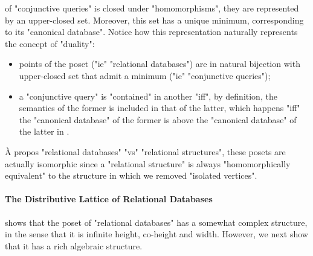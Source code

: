 of "conjunctive queries" is closed under "homomorphisms", they are represented by an upper-closed set. Moreover, this set has a unique minimum, corresponding to its "canonical database".
Notice how this representation naturally represents the concept of "duality":
\begin{itemize}
	\item points of the poset ("ie" "relational databases") are in natural
		bijection with upper-closed set that admit a minimum ("ie" "conjunctive queries");
	\item a "conjunctive query" is "contained" in another "iff", by definition,
		the semantics of the former is included in that of the latter, which happens
		"iff" the "canonical database" of the former is above the "canonical database" of the latter
		in .
\end{itemize}

\begin{remark}
	\label{rk:database-vs-structures}
	À propos "relational databases" "vs" "relational structures",
	these posets are actually isomorphic 
	since a "relational structure" is always "homomorphically equivalent"
	to the structure in which we removed "isolated vertices".
\end{remark}

\paragraph*{The Distributive Lattice of Relational Databases}

 shows that the poset of "relational databases" has a somewhat
complex structure, in the sense that it is infinite height, co-height and width.
However, we next show that it has a rich algebraic structure.

